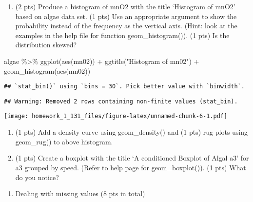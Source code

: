 \documentclass[
]{article}
\newenvironment{Shaded}{\begin{snugshade}}{\end{snugshade}}
\newcommand{\FunctionTok}[1]{\textcolor[rgb]{0.00,0.00,0.00}{#1}}
\newcommand{\NormalTok}[1]{#1}
\newcommand{\SpecialCharTok}[1]{\textcolor[rgb]{0.00,0.00,0.00}{#1}}
\newcommand{\StringTok}[1]{\textcolor[rgb]{0.31,0.60,0.02}{#1}}
\providecommand{\tightlist}{%
  \setlength{\itemsep}{0pt}\setlength{\parskip}{0pt}}
\begin{document}
\begin{enumerate}
\def\labelenumi{\alph{enumi}.}
\tightlist
\item
  (2 pts) Produce a histogram of mnO2 with the title `Histogram of mnO2'
  based on algae data set. (1 pts) Use an appropriate argument to show
  the probability instead of the frequency as the vertical axis. (Hint:
  look at the examples in the help file for function geom\_histogram()).
  (1 pts) Is the distribution skewed?
\end{enumerate}

\begin{Shaded}
\begin{Highlighting}[]
\NormalTok{algae }\SpecialCharTok{\%\textgreater{}\%}
  \FunctionTok{ggplot}\NormalTok{(}\FunctionTok{aes}\NormalTok{(mn02)) }\SpecialCharTok{+} \FunctionTok{ggtitle}\NormalTok{(}\StringTok{"Histogram of mn02"}\NormalTok{) }\SpecialCharTok{+}
  \FunctionTok{geom\_histogram}\NormalTok{(}\FunctionTok{aes}\NormalTok{(mn02))}
\end{Highlighting}
\end{Shaded}

\begin{verbatim}
## `stat_bin()` using `bins = 30`. Pick better value with `binwidth`.
\end{verbatim}

\begin{verbatim}
## Warning: Removed 2 rows containing non-finite values (stat_bin).
\end{verbatim}

\texttt{[image: homework\_1\_131\_files/figure-latex/unnamed-chunk-6-1.pdf]}

\begin{enumerate}
\def\labelenumi{\alph{enumi}.}
\setcounter{enumi}{1}
\item
  (1 pts) Add a density curve using geom\_density() and (1 pts) rug
  plots using geom\_rug() to above histogram.
\item
  (1 pts) Create a boxplot with the title `A conditioned Boxplot of
  Algal a3' for a3 grouped by speed. (Refer to help page for
  geom\_boxplot()). (1 pts) What do you notice?
\end{enumerate}

\begin{enumerate}
\def\labelenumi{\arabic{enumi}.}
\setcounter{enumi}{2}
\tightlist
\item
  Dealing with missing values (8 pts in total)
\end{enumerate}
\end{document}
